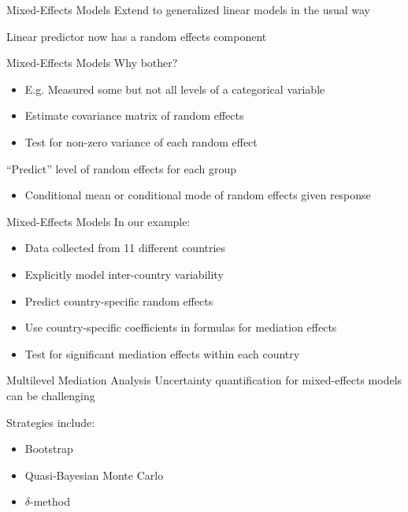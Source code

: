 \documentclass[14pt]{beamer}
\newcommand{\GLMMs}{Mixed-Effects Models}
\begin{document}
\begin{frame}{\GLMMs}
    Extend to generalized linear models in the usual way \newline

    Linear predictor now has a random effects component \newline
\end{frame}

\begin{frame}{\GLMMs}
    Why bother?
    \begin{itemize}
        \item E.g. Measured some but not all levels of a categorical variable
        \item Estimate covariance matrix of random effects
        \item Test for non-zero variance of each random effect \newline
    \end{itemize}

    ``Predict'' level of random effects for each group
    \begin{itemize}
        \item Conditional mean or conditional mode of random effects given response
    \end{itemize}
\end{frame}

\begin{frame}{\GLMMs}
    In our example:
    \begin{itemize}
        \item Data collected from 11 different countries
        \item Explicitly model inter-country variability
        \item Predict country-specific random effects
        \item Use country-specific coefficients in formulas for mediation effects
        \item Test for significant mediation effects within each country \newline
    \end{itemize}
\end{frame}

\begin{frame}{Multilevel Mediation Analysis}
    Uncertainty quantification for mixed-effects models can be challenging  \newline
    
    Strategies include:
    \begin{itemize}
        \item Bootstrap
        \item Quasi-Bayesian Monte Carlo
        \item $\delta$-method
    \end{itemize}
\end{frame}
\end{document}
